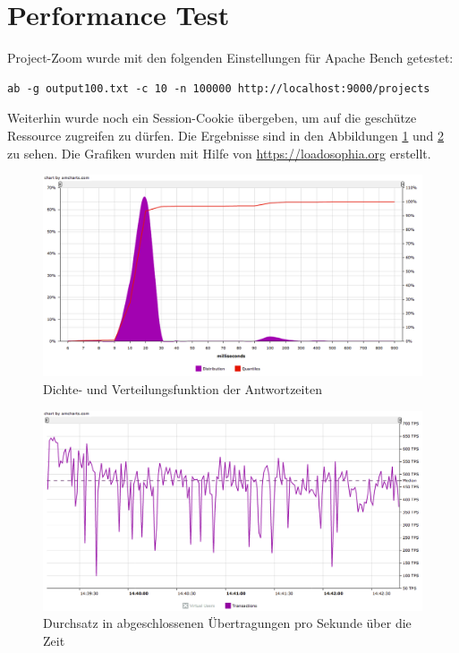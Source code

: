 \section{Performance Test}
\label{sec:performance-test}
Project-Zoom wurde mit den folgenden Einstellungen für Apache Bench getestet:
\begin{lstlisting}
ab -g output100.txt -c 10 -n 100000 http://localhost:9000/projects
\end{lstlisting}

Weiterhin wurde noch ein Session-Cookie übergeben, um auf die geschütze Ressource zugreifen zu dürfen. Die Ergebnisse sind in den Abbildungen \ref{fig:perf1} und \ref{fig:perf2} zu sehen. Die Grafiken wurden mit Hilfe von \url{https://loadosophia.org} erstellt.

\begin{figure}
  \centering     
  \includegraphics[width=1.0\textwidth]{img/perf1.png}  
   \caption{Dichte- und Verteilungsfunktion der Antwortzeiten }
  \label{fig:perf1} 
\end{figure}

\begin{figure}  
  \centering     
  \includegraphics[width=1.0\textwidth]{img/perf2.png}  
   \caption{Durchsatz in abgeschlossenen Übertragungen pro Sekunde über die Zeit}
  \label{fig:perf2} 
\end{figure}


